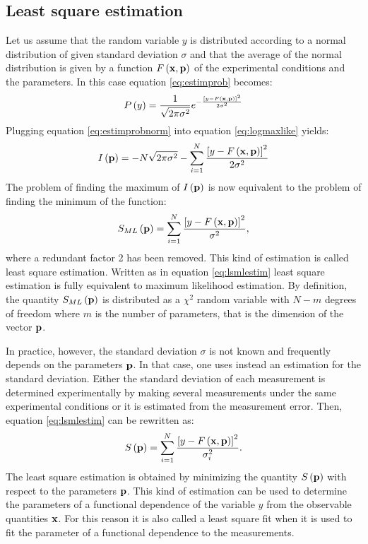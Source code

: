 \documentclass[twoside]{book}
\begin{document}
\subsection{Least square estimation}
Let us assume that the random variable $y$ is distributed
according to a normal distribution of given standard deviation
$\sigma$ and that the average of the normal distribution is given
by a function $F\left({\bf x},{\bf p}\right)$ of the experimental
conditions and the parameters. In this case equation
\ref{eq:estimprob} becomes:
\begin{equation}
\label{eq:estimprobnorm}
  P\left(y\right)={1\over\sqrt{2\pi\sigma^2}}e^{-{
  \left[y-F\left({\bf x},{\bf p}\right)\right]^2\over 2\sigma^2}}
\end{equation}
Plugging equation \ref{eq:estimprobnorm} into equation
\ref{eq:logmaxlike} yields:
\begin{equation}
  I\left({\bf p}\right)=-N\sqrt{2\pi\sigma^2}-
  \sum_{i=1}^N {
  \left[y-F\left({\bf x},{\bf p}\right)\right]^2\over 2\sigma^2}
\end{equation}
The problem of finding the maximum of $I\left({\bf p}\right)$ is
now equivalent to the problem of finding the minimum of the
function:
\begin{equation}
\label{eq:lsmlestim}
  S_{\mathop{ML}}\left({\bf p}\right)=\sum_{i=1}^N {
  \left[y-F\left({\bf x},{\bf p}\right)\right]^2\over \sigma^2},
\end{equation}
where a redundant factor 2 has been removed. This kind of
estimation is called least square estimation. Written as in
equation \ref{eq:lsmlestim} least square estimation is fully
equivalent to maximum likelihood estimation. By definition, the
quantity $S_{\mathop{ML}}\left({\bf p}\right)$ is distributed as a
$\chi^2$ random variable with $N-m$ degrees of freedom where $m$
is the number of parameters, that is the dimension of the vector
${\bf p}$.

In practice, however, the standard deviation $\sigma$ is not known
and frequently depends on the parameters ${\bf p}$. In that case,
one uses instead an estimation for the standard deviation. Either
the standard deviation of each measurement is determined
experimentally by making several measurements under the same
experimental conditions or it is estimated from the measurement
error. Then, equation \ref{eq:lsmlestim} can be rewritten as:
\begin{equation}
\label{eq:lsestim}
  S\left({\bf p}\right)=\sum_{i=1}^N {
  \left[y-F\left({\bf x},{\bf p}\right)\right]^2\over \sigma_i^2}.
\end{equation}
The least square estimation is obtained by minimizing the quantity
$S\left({\bf p}\right)$ with respect to the parameters ${\bf p}$.
This kind of estimation can be used to determine the parameters of
a functional dependence of the variable $y$ from the observable
quantities ${\bf x}$. For this reason it is also called a least
square fit when it is used to fit the parameter of a functional
dependence to the measurements.
\end{document}
